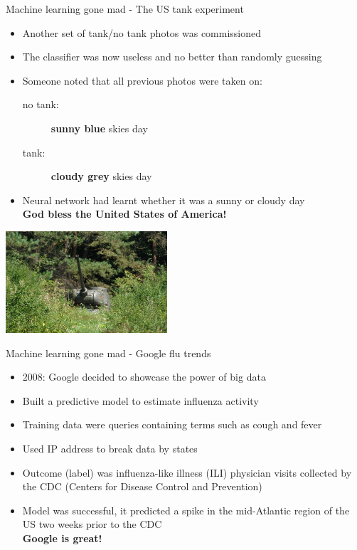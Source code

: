 \documentclass[pdf]{beamer}
\begin{document}
\begin{frame}{Machine learning gone mad - The US tank experiment}
\begin{itemize}\addtolength{\itemsep}{0.5\baselineskip}
	\item<1-> Another set of tank/no tank photos was commissioned
	\item<2-> The classifier was now useless and no better than randomly guessing
	\item<3-> Someone noted that all previous photos were taken on:
	\begin{description}
		\item[no tank:] \textbf{sunny blue} skies day
		\item[tank:] \textbf{cloudy grey} skies day
	\end{description}
	\item<4-> Neural network had learnt whether it was a sunny or cloudy day\\
	\textbf{God bless the United States of America!}
\end{itemize}	
\begin{center}
		\includegraphics[width=0.45\textwidth]{tank.jpg}
\end{center}
\end{frame}	

\begin{frame}{Machine learning gone mad - Google flu trends}
\begin{itemize}\addtolength{\itemsep}{1\baselineskip}
	\item<1-> 2008: Google decided to showcase the power of big data 
	\item<2-> Built a predictive model to estimate influenza activity	
	\item<3-> Training data were queries containing terms such as cough and fever
	\item<4-> Used IP address to break data by states
	\item<5-> Outcome (label) was influenza-like illness (ILI) physician visits collected by the CDC 
	(Centers for Disease Control and Prevention)
	\item<6-> Model was successful, it predicted a spike in the mid-Atlantic region of the US two weeks prior to the CDC\\
	\textbf{Google is great!}
\end{itemize}
\end{frame}
\end{document}
